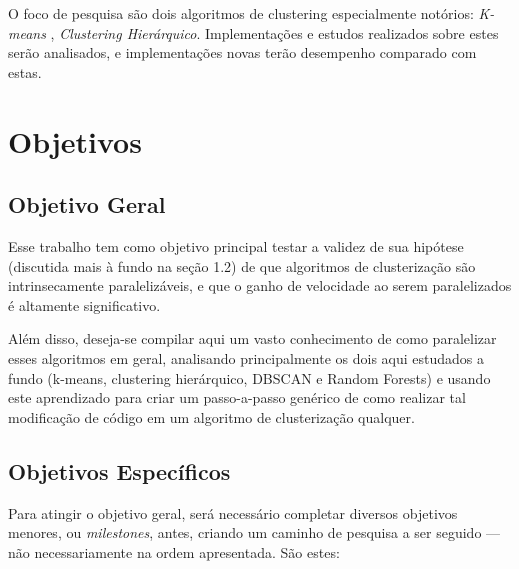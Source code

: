 \documentclass[12pt, %
openright, 
oneside, %
a4paper,    %
brazil]{facom-ufu-abntex2}
\def\qntAlgrtm{dois}
\begin{document}

O foco de pesquisa são \qntAlgrtm{} algoritmos de clustering especialmente notórios: \textit{K-means} \cite{GPU-accelerated-K-Means}, \textit{Clustering Hierárquico}. Implementações e estudos realizados sobre estes serão analisados, e implementações novas terão desempenho comparado com estas.


\section{Objetivos}

\subsection{Objetivo Geral}

Esse trabalho tem como objetivo principal testar a validez de sua hipótese (discutida mais à fundo na seção 1.2) de que algoritmos de clusterização são intrinsecamente paralelizáveis, e que o ganho de velocidade ao serem paralelizados é altamente significativo.

Além disso, deseja-se compilar aqui um vasto conhecimento de como paralelizar esses algoritmos em geral, analisando principalmente os \qntAlgrtm{} aqui estudados a fundo (k-means, clustering hierárquico, DBSCAN e Random Forests) e usando este aprendizado para criar um passo-a-passo genérico de como realizar tal modificação de código em um algoritmo de clusterização qualquer.

\subsection{Objetivos Específicos}

Para atingir o objetivo geral, será necessário completar diversos objetivos menores, ou \textit{milestones}, antes, criando um caminho de pesquisa a ser seguido --- não necessariamente na ordem apresentada. São estes:
\end{document}
